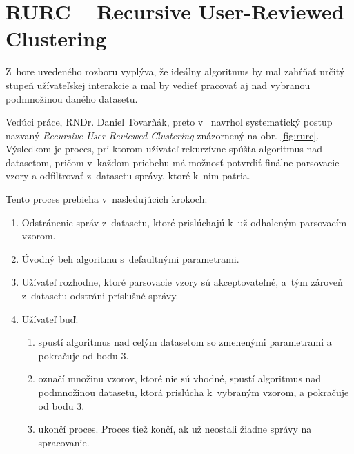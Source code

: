 \section{RURC -- Recursive User-Reviewed Clustering}
\label{sec:rurc}
Z~hore uvedeného rozboru vyplýva, že ideálny algoritmus by mal zahŕňať určitý stupeň užívateľskej interakcie a mal by vedieť pracovať aj nad vybranou podmnožinou daného datasetu.
\par Vedúci práce, RNDr. Daniel Tovarňák, preto v~\parencite{Tovarnak2017} navrhol syste\-matický postup nazvaný \emph{Recursive User-Reviewed Clustering} znázornený na obr. \ref{fig:rurc}. Výsledkom je proces, pri ktorom užívateľ rekurzívne spúšťa algoritmus nad datasetom, pričom v~každom priebehu má možnosť potvrdiť finálne parsovacie vzory a odfiltrovať z~datasetu správy, ktoré k~nim patria.
\par Tento proces prebieha v~nasledujúcich krokoch:

\begin{enumerate}
  \item Odstránenie správ z~datasetu, ktoré prislúchajú k~už odhaleným parsovacím vzorom.
  \item Úvodný beh algoritmu s~defaultnými parametrami.
  \item Užívateľ rozhodne, ktoré parsovacie vzory sú akceptovateľné, a~tým zároveň z~datasetu odstráni príslušné správy.
  \item Užívateľ buď:
  	\begin{enumerate}
   		 \item spustí algoritmus nad celým datasetom so zmenenými parametrami a pokračuje od bodu 3.
   		 \item označí množinu vzorov, ktoré nie sú vhodné, spustí algoritmus nad podmnožinou datasetu, ktorá prislúcha k~vyb\-raným vzorom, a 				pokračuje od bodu 3.
   		 \item ukončí proces. Proces tiež končí, ak už neostali žiadne správy na spracovanie.
 	 \end{enumerate}
\end{enumerate}

